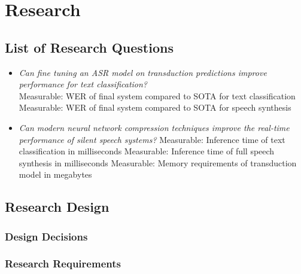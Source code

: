 \chapter{Research} \label{chap:research}

\section{List of Research Questions}

\begin{itemize}
    \item \textit{Can fine tuning an ASR model on transduction predictions
    improve performance for text classification?} \\
    Measurable: WER of final system compared to SOTA for text classification \\
    Measurable: WER of final system compared to SOTA for speech synthesis
    \item \textit{Can modern neural network compression techniques improve
    the real-time performance of silent speech systems?}
    Measurable: Inference time of text classification in milliseconds
    Measurable: Inference time of full speech synthesis in milliseconds
    Measurable: Memory requirements of transduction model in megabytes
\end{itemize}

\section{Research Design}



\subsection{Design Decisions}



\subsection{Research Requirements}

